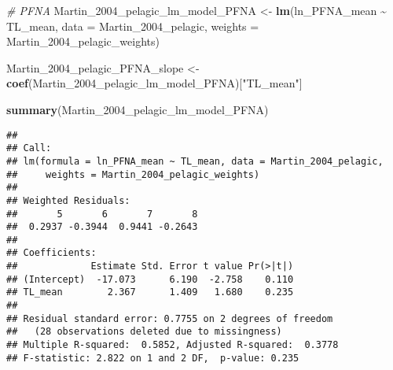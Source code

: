 \documentclass[
]{article}
\newenvironment{Shaded}{\begin{snugshade}}{\end{snugshade}}
\newcommand{\AttributeTok}[1]{\textcolor[rgb]{0.13,0.29,0.53}{#1}}
\newcommand{\CommentTok}[1]{\textcolor[rgb]{0.56,0.35,0.01}{\textit{#1}}}
\newcommand{\FunctionTok}[1]{\textcolor[rgb]{0.13,0.29,0.53}{\textbf{#1}}}
\newcommand{\NormalTok}[1]{#1}
\newcommand{\OtherTok}[1]{\textcolor[rgb]{0.56,0.35,0.01}{#1}}
\newcommand{\SpecialCharTok}[1]{\textcolor[rgb]{0.81,0.36,0.00}{\textbf{#1}}}
\newcommand{\StringTok}[1]{\textcolor[rgb]{0.31,0.60,0.02}{#1}}
\begin{document}
\begin{Shaded}
\begin{Highlighting}[]
\CommentTok{\# PFNA}
\NormalTok{Martin\_2004\_pelagic\_lm\_model\_PFNA }\OtherTok{\textless{}{-}} \FunctionTok{lm}\NormalTok{(ln\_PFNA\_mean }\SpecialCharTok{\textasciitilde{}}\NormalTok{ TL\_mean, }
                                        \AttributeTok{data =}\NormalTok{ Martin\_2004\_pelagic,}
                                        \AttributeTok{weights =}\NormalTok{ Martin\_2004\_pelagic\_weights)}

\NormalTok{Martin\_2004\_pelagic\_PFNA\_slope }\OtherTok{\textless{}{-}} \FunctionTok{coef}\NormalTok{(Martin\_2004\_pelagic\_lm\_model\_PFNA)[}\StringTok{"TL\_mean"}\NormalTok{]}

\FunctionTok{summary}\NormalTok{(Martin\_2004\_pelagic\_lm\_model\_PFNA)}
\end{Highlighting}
\end{Shaded}

\begin{verbatim}
## 
## Call:
## lm(formula = ln_PFNA_mean ~ TL_mean, data = Martin_2004_pelagic, 
##     weights = Martin_2004_pelagic_weights)
## 
## Weighted Residuals:
##       5       6       7       8 
##  0.2937 -0.3944  0.9441 -0.2643 
## 
## Coefficients:
##             Estimate Std. Error t value Pr(>|t|)
## (Intercept)  -17.073      6.190  -2.758    0.110
## TL_mean        2.367      1.409   1.680    0.235
## 
## Residual standard error: 0.7755 on 2 degrees of freedom
##   (28 observations deleted due to missingness)
## Multiple R-squared:  0.5852, Adjusted R-squared:  0.3778 
## F-statistic: 2.822 on 1 and 2 DF,  p-value: 0.235
\end{verbatim}
\end{document}
